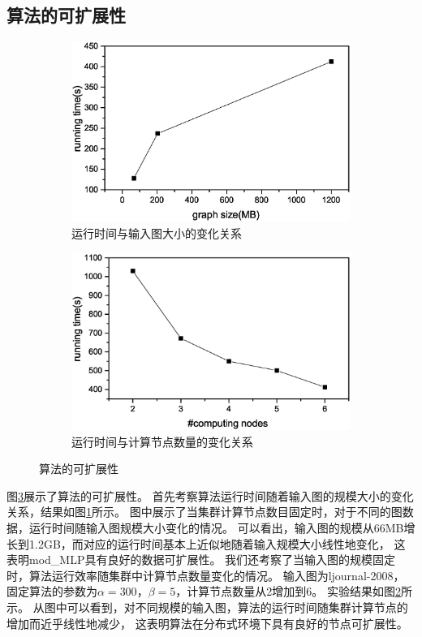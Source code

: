 \documentclass[master]{njuthesis}
\begin{document}
\subsection{算法的可扩展性}
\begin{figure}[t]
\centering
\begin{subfigure}[b]{0.48\textwidth}
	\center
	\includegraphics[width=1\textwidth]{figure/data_scala.eps}
	\caption{运行时间与输入图大小的变化关系}
	\label{fig:ch2:data_scalabity}
\end{subfigure}
\begin{subfigure}[b]{0.48\textwidth}
	\centering
	\includegraphics[width=1\textwidth]{figure/node_scalabity.eps}
	\caption{运行时间与计算节点数量的变化关系}
	\label{fig:ch2:node_scalabity}
\end{subfigure}
\caption{算法的可扩展性}
\label{fig:scalabityyy}
\end{figure}
图\ref{fig:scalabityyy}展示了算法的可扩展性。
首先考察算法运行时间随着输入图的规模大小的变化关系，结果如图\ref{fig:ch2:data_scalabity}所示。
图中展示了当集群计算节点数目固定时，对于不同的图数据，运行时间随输入图规模大小变化的情况。 
可以看出，输入图的规模从66MB增长到1.2GB，而对应的运行时间基本上近似地随着输入规模大小线性地变化，
这表明mod\string_MLP具有良好的数据可扩展性。
我们还考察了当输入图的规模固定时，算法运行效率随集群中计算节点数量变化的情况。
输入图为ljournal-2008，固定算法的参数为$\alpha=300$，$\beta=5$，计算节点数量从2增加到6。
实验结果如图\ref{fig:ch2:node_scalabity}所示。
从图中可以看到，对不同规模的输入图，算法的运行时间随集群计算节点的增加而近乎线性地减少，
这表明算法在分布式环境下具有良好的节点可扩展性。
\end{document}
